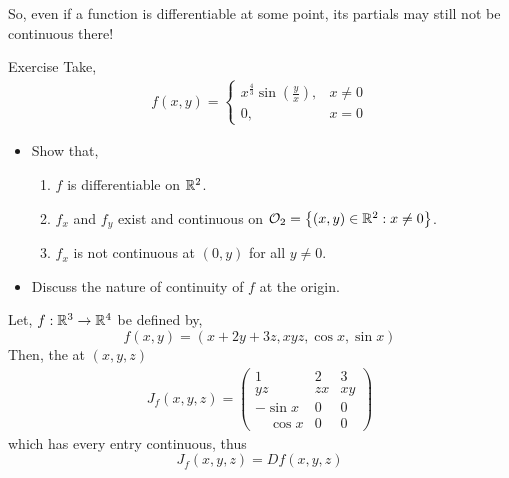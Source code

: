 \documentclass[../Analysis-3.tex]{subfiles}
\begin{document}
So, even if a function is differentiable at some point, its partials may still not be continuous there!

\begin{Eg}{Exercise}{}
  Take, \begin{align*}
    f(x,y) = \begin{cases}
               x^{\frac{4}{3}}\sin{\left( \frac{y}{x} \right)}, & x \not= 0 \\
               0,                                               & x = 0
             \end{cases}
  \end{align*}
  \begin{itemize}
    \item Show that, \begin{enumerate}
            \item $ f $ is differentiable on $ \mathbb{R}^2 $.
            \item $ f_x $ and $ f_y $ exist and continuous on $ \mathcal{O}_{2} = \left\{ (x,y)\in\mathbb{R}^2 : x \not= 0 \right\} $.
            \item $ f_x $ is not continuous at $ (0,y) $ for all $ y \not= 0 $.
          \end{enumerate}
    \item Discuss the nature of continuity of $ f $ at the origin.
  \end{itemize}
\end{Eg}

\begin{Eg}{}{}
  Let, $ f:\mathbb{R}^3 \to \mathbb{R}^4 $ be defined by, \[ f(x,y) = \left( x+2y+3z, xyz, \cos{x}, \sin{x} \right) \]
  Then, the  at $ (x,y,z) $  \begin{align*}
    J_{f}(x,y,z) = \begin{pmatrix}
                     1             & 2  & 3  \\
                     yz            & zx & xy \\
                     -\sin{x}      & 0  & 0  \\
                     \quad \cos{x} & 0  & 0
                   \end{pmatrix}
  \end{align*}
  which has every entry continuous, thus \[J_{f}(x,y,z) = Df(x,y,z)\]
\end{Eg}
\end{document}
